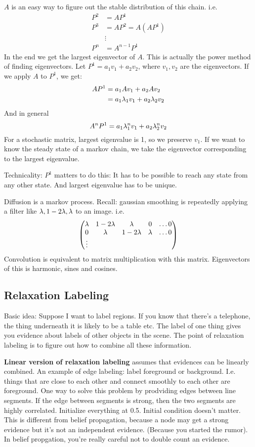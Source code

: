 $A$ is an easy way to figure out the stable distribution of this
chain. i.e.
\begin{align*}
   P^2 &= AP^1\\
   P^3 &= AP^2 = A(AP^1)\\
&\vdots\\
P^n &= A^{n-1}P^1
\end{align*}
In the end we get the largest eigenvector of $A$. This is actually the
power method of finding eigenvectors.
Let $P^1 = a_1v_1 + a_2v_2$, where $v_1,v_2$ are the eigenvectors. If
we apply $A$ to $P^1$, we get:
\begin{align*}
AP^1 &=a_1Av_1 + a_2Av_2\\
&= a_1 \lambda_1v_1 + a_2 \lambda_2v_2
\end{align*}
And in general
\begin{equation}
A^{n}P^1 = a_1\lambda_1^nv_1 + a_2\lambda_2^nv_2\label{eq:29}
\end{equation}
For a stochastic matrix, largest eigenvalue is 1, so we preserve
$v_1$. If we want to know the steady state of a markov chain, we take
the eigenvector corresponding to the largest eigenvalue.

Technicality: $P^1$ matters to do this: It has to be possible to
reach any state from any other state. And largest eigenvalue has to be
unique. 

Diffusion is a markov process.
Recall: gaussian smoothing is repeatedly applying a filter like $\lambda,
1-2\lambda, \lambda$ to an image. i.e.
$$\begin{pmatrix}
  \lambda & 1-2\lambda& \lambda & 0 & \dots 0\\
0&  \lambda & 1-2\lambda& \lambda &  \dots 0\\
\vdots
\end{pmatrix}$$
Convolution is equivalent to matrix multiplication with this matrix.
Eigenvectors of this is harmonic, sines and cosines.

\subsection{Relaxation Labeling}
\label{sec:relaxation-labeling}

Basic idea: Suppose I want to label regions. If you know that there's
a telephone, the thing underneath it is likely to be a table etc. The
label of one thing gives you evidence about labels of other objects in
the scene. The point of relaxation labeling is to figure out how to
combine all these information.

\textbf{Linear version of relaxation labeling} assumes that evidences can be
linearly combined. An example of edge labeling: label foreground or
background. I.e. things that are close to each other and connect
smoothly to each other are foreground. One way to solve this problem
by prodviding edges between line segments. If the edge between
segments is strong, then the two segments are highly correlated.
Initialize everything at 0.5. Initial condition doesn't matter. 
This is different from belief propagation, because a node may get a
strong evidence but it's not an independent evidence. (Because you
started the rumor). In belief propgation, you're really careful not to
double count an evidence. 

